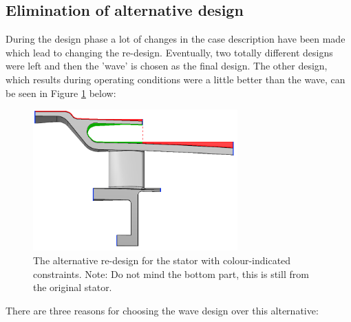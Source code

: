 \subsection{Elimination of alternative design}
\label{AppendixA3}
During the design phase a lot of changes in the case description have been made which lead to changing the re-design. Eventually, two totally different designs were left and then the 'wave' is chosen as the final design. The other design, which results during operating conditions were a little better than the wave, can be seen in Figure \ref{fig:dakje_design} below:
\begin{figure}[H]
\centering
\includegraphics[width=0.7\textwidth]{Figures/dakje_design.PNG}
\caption{The alternative re-design for the stator with colour-indicated constraints. Note: Do not mind the bottom part, this is still from the original stator.}
\label{fig:dakje_design}
\end{figure}
There are three reasons for choosing the wave design over this alternative:
